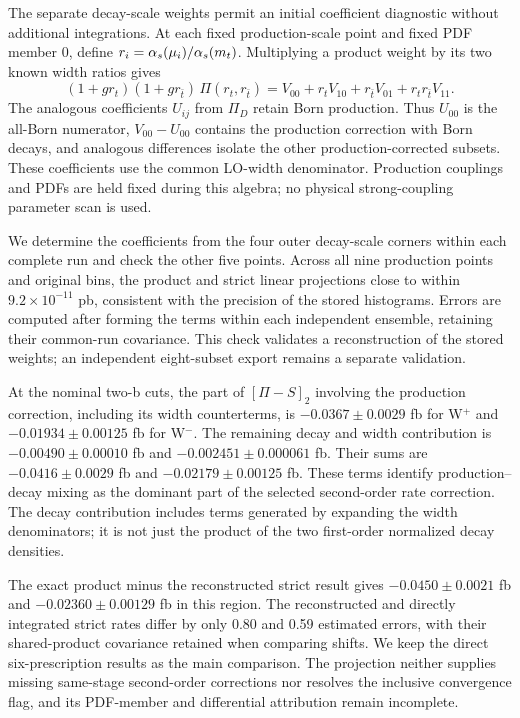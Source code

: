 The separate decay-scale weights permit an initial coefficient diagnostic
without additional integrations. At each fixed production-scale point
and fixed PDF member 0, define $r_i=\alpha_s(\mu_i)/\alpha_s(m_t)$. Multiplying a
product weight by its two known width ratios gives
\begin{equation}
 (1+g r_t)(1+g r_{\bar t})\,\Pi(r_t,r_{\bar t})
 = V_{00}+r_t V_{10}+r_{\bar t} V_{01}+r_t r_{\bar t}V_{11}.
\end{equation}
The analogous coefficients $U_{ij}$ from $\Pi_D$ retain Born production.
Thus $U_{00}$ is the all-Born numerator, $V_{00}-U_{00}$ contains the
production correction with Born decays, and analogous differences isolate
the other production-corrected subsets. These coefficients use the common
LO-width denominator. Production couplings and PDFs are held fixed during
this algebra; no physical strong-coupling parameter scan is used.

We determine the coefficients from the four outer decay-scale corners
within each complete run and check the other five points. Across all nine
production points and original bins, the product and strict linear
projections close to within $9.2\times10^{-11}$ pb, consistent with the
precision of the stored histograms. Errors are computed after forming the
terms within each independent ensemble, retaining their common-run
covariance. This check validates a reconstruction of the stored weights;
an independent eight-subset export remains a separate validation.

At the nominal two-b cuts, the part of $[\Pi-S]_2$ involving the production
correction, including its width counterterms, is
$-0.0367\pm0.0029$ fb for W$^+$ and $-0.01934\pm0.00125$ fb for W$^-$.
The remaining decay and width contribution is
$-0.00490\pm0.00010$ fb and $-0.002451\pm0.000061$ fb.
Their sums are $-0.0416\pm0.0029$ fb and $-0.02179\pm0.00125$ fb.
These terms identify production--decay mixing as the dominant part of the
selected second-order rate correction. The decay contribution includes
terms generated by expanding the width denominators; it is not just the
product of the two first-order normalized decay densities.

The exact product minus the reconstructed strict result gives
$-0.0450\pm0.0021$ fb and $-0.02360\pm0.00129$ fb in this region.
The reconstructed and directly integrated strict rates differ by only
0.80 and 0.59 estimated errors, with their shared-product covariance retained
when comparing shifts. We keep the direct six-prescription results as the
main comparison. The projection neither supplies missing same-stage
second-order corrections nor resolves the inclusive convergence flag,
and its PDF-member and differential attribution remain incomplete.

